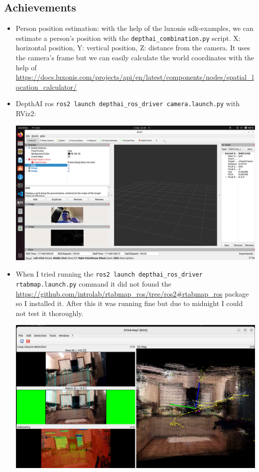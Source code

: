 \documentclass{article}
\begin{document}
\subsection{Achievements}
\begin{itemize}
    \item Person position estimation: with the help of the luxonis sdk-examples, we can estimate a person's position with the \verb|depthai_combination.py| script. X: horizontal position, Y: vertical position, Z: distance from the camera. It uses the camera's frame but we can easily calculate the world coordinates with the help of \url{https://docs.luxonis.com/projects/api/en/latest/components/nodes/spatial_location_calculator/}
    \item DepthAI ros \verb|ros2 launch depthai_ros_driver camera.launch.py| with RViz2:\par
    \begin{minipage}{\linewidth}
        \centering
        \includegraphics[width=1\linewidth]{images/depthai_ros_camera.png}
    \end{minipage}
    \item When I tried running the \verb|ros2 launch depthai_ros_driver rtabmap.launch.py| command it did not found the \url{https://github.com/introlab/rtabmap_ros/tree/ros2#rtabmap_ros} package so I installed it. After this it was running fine but due to midnight I could not test it thoroughly.\par
    \begin{minipage}{\linewidth}
        \centering
        \includegraphics[width=1\linewidth]{images/rtabmap_ros.png}

\end{minipage}
\end{itemize}
\end{document}
